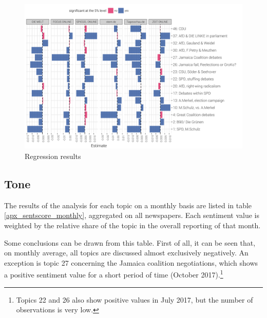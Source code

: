\documentclass[12pt,a4paper,notitlepage]{article}
\begin{document}
\begin{figure}[H]
	\caption{Regression results}
		\begin{center}
			\includegraphics[width=\textwidth,keepaspectratio]{figs/estimates.png}
		\end{center}
	\label{fig_estimateEffects}
\end{figure}


\subsection{Tone}\label{subsection_tone}

The results of the analysis for each topic on a monthly basis are listed in table \ref{apx_sentscore_monthly}, aggregated on all newspapers. Each sentiment value is weighted by the relative share of the topic in the overall reporting of that month. 

Some conclusions can be drawn from this table. First of all, it can be seen that, on monthly average, all topics are discussed almost exclusively negatively. An exception is topic 27 concerning the Jamaica coalition negotiations, which shows a positive sentiment value for a short period of time (October 2017).\footnote{Topics 22 and 26 also show positive values in July 2017, but the number of observations is very low.} 
\end{document}

